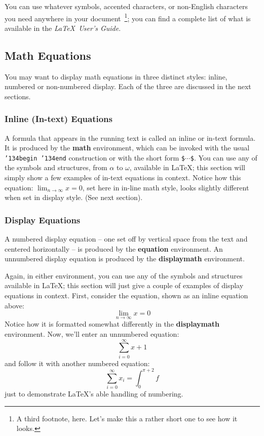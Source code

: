 \documentclass[article]{stucosrec}
\begin{document}
	You can use whatever symbols, accented characters, or non-English characters you need anywhere in your document~\footnote{A third footnote, here. Let's make this a rather short one to see how it looks.}; you can find a complete list of what is available in the \textit{\LaTeX\
	User's Guide}\cite{Lamport:LaTeX}.
	
	\subsection{Math Equations}
	
	You may want to display math equations in three distinct styles:
	inline, numbered or non-numbered display.  Each of
	the three are discussed in the next sections.
	
	\subsubsection{Inline (In-text) Equations}
	
	A formula that appears in the running text is called an inline or in-text formula.
	It is produced by the \textbf{math} environment, which can be invoked with the usual \texttt{{\char'134}begin {\char'134}end} construction or with the short form \texttt{\$$\cdots$\$}.
	You can use any of the symbols and structures, from $\alpha$ to $\omega$, available in \LaTeX\cite{Lamport:LaTeX}; this section will simply show a few examples of in-text equations in context.
	Notice how this equation: 
	\begin{math}\lim_{n\rightarrow \infty}x=0\end{math}, 
	set here in in-line math style, looks slightly different when set in display style.
	(See next section).
	
	\subsubsection{Display Equations}
	
	A numbered display equation -- one set off by vertical space from the text and centered horizontally -- is produced by the \textbf{equation} environment.
	An unnumbered display equation is produced by the \textbf{displaymath} environment.
	
	Again, in either environment, you can use any of the symbols and structures available in \LaTeX; this section will just give a couple of examples of display equations in context.
	First, consider the equation, shown as an inline equation above:
	\begin{equation}\lim_{n\rightarrow \infty}x=0\end{equation}
	Notice how it is formatted somewhat differently in the \textbf{displaymath} environment.
	Now, we'll enter an unnumbered equation:
	\begin{displaymath}\sum_{i=0}^{\infty} x + 1\end{displaymath}
	and follow it with another numbered equation:
	\begin{equation}\sum_{i=0}^{\infty}x_i=\int_{0}^{\pi+2} f\end{equation}
	just to demonstrate \LaTeX's able handling of numbering.
	
\end{document}
